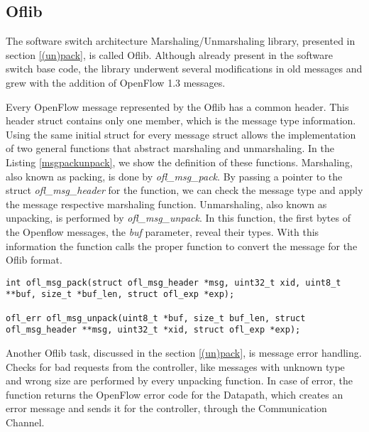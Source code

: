\subsection{Oflib}
\label{sec:sec41}

The software switch architecture Marshaling/Unmarshaling library, presented in section \ref{(un)pack}, is called Oflib. Although already present in the software switch base code, the library underwent several modifications in old messages and grew with the addition of OpenFlow 1.3 messages.

Every OpenFlow message represented by the Oflib has a common header. This header struct contains only one member, which is the message type information. Using the same initial struct for every message struct allows the implementation of two general functions that abstract marshaling and unmarshaling. In the Listing \ref{msgpackunpack}, we show the definition of these functions. Marshaling, also known as packing, is done by \textit{ofl_msg_pack}. By passing a pointer to the struct \textit{ofl_msg_header} for the function, we can check the message type and apply the message respective marshaling function. Unmarshaling, also known as unpacking, is performed by \textit{ofl_msg_unpack}. In this function, the first bytes of the Openflow messages, the \textit{buf} parameter, reveal their types. With this information the function calls the proper function to convert the message for the Oflib format.  
\begin{lstlisting}[caption={Oflib: message pack and unpack base functions}, label=msgpackunpack,]
int ofl_msg_pack(struct ofl_msg_header *msg, uint32_t xid, uint8_t **buf, size_t *buf_len, struct ofl_exp *exp);

ofl_err ofl_msg_unpack(uint8_t *buf, size_t buf_len, struct ofl_msg_header **msg, uint32_t *xid, struct ofl_exp *exp);
\end{lstlisting}

Another Oflib task, discussed in the section \ref{(un)pack}, is message error handling. Checks for bad requests from the controller, like messages with unknown type and wrong size are performed by every unpacking function. In case of error, the function returns the OpenFlow error code for the Datapath, which creates an error message and sends it for the controller, through the Communication Channel.


